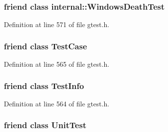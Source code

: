 \subsubsection[{\texorpdfstring{internal\+::\+Windows\+Death\+Test}{internal::WindowsDeathTest}}]{\setlength{\rightskip}{0pt plus 5cm}friend class internal\+::\+Windows\+Death\+Test\hspace{0.3cm}{\ttfamily [friend]}}\hypertarget{classtesting_1_1_test_result_a6aeedc04a0590fcc1b3c5f687dbb0f9f}{}\label{classtesting_1_1_test_result_a6aeedc04a0590fcc1b3c5f687dbb0f9f}


Definition at line 571 of file gtest.\+h.

\subsubsection[{\texorpdfstring{Test\+Case}{TestCase}}]{\setlength{\rightskip}{0pt plus 5cm}friend class {\bf Test\+Case}\hspace{0.3cm}{\ttfamily [friend]}}\hypertarget{classtesting_1_1_test_result_aff779e55b06adfa7c0088bd10253f0f0}{}\label{classtesting_1_1_test_result_aff779e55b06adfa7c0088bd10253f0f0}


Definition at line 565 of file gtest.\+h.

\subsubsection[{\texorpdfstring{Test\+Info}{TestInfo}}]{\setlength{\rightskip}{0pt plus 5cm}friend class {\bf Test\+Info}\hspace{0.3cm}{\ttfamily [friend]}}\hypertarget{classtesting_1_1_test_result_a4c49c2cdb6c328e6b709b4542f23de3c}{}\label{classtesting_1_1_test_result_a4c49c2cdb6c328e6b709b4542f23de3c}


Definition at line 564 of file gtest.\+h.

\subsubsection[{\texorpdfstring{Unit\+Test}{UnitTest}}]{\setlength{\rightskip}{0pt plus 5cm}friend class {\bf Unit\+Test}\hspace{0.3cm}{\ttfamily [friend]}}\hypertarget{classtesting_1_1_test_result_a832b4d233efee1a32feb0f4190b30d39}{}\label{classtesting_1_1_test_result_a832b4d233efee1a32feb0f4190b30d39}


